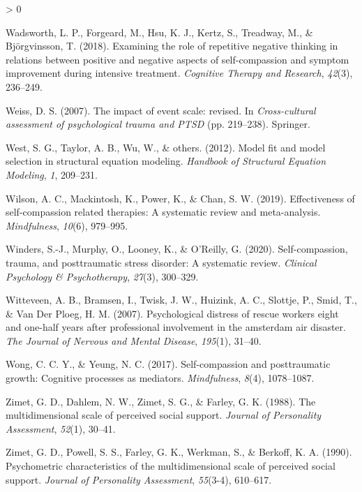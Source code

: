 \documentclass[
  english,
  man,floatsintext]{apa7}
\newlength{\cslhangindent}
\newenvironment{CSLReferences}[2] %
 {%
  \setlength{\parindent}{0pt}
  \ifodd #1 \everypar{\setlength{\hangindent}{\cslhangindent}}\ignorespaces\fi
  \ifnum #2 > 0
  \setlength{\parskip}{#2\baselineskip}
  \fi
 }%
 {}
\begin{document}
\begin{CSLReferences}{1}{0}
\leavevmode\hypertarget{ref-wadsworth2018examining}{}%
Wadsworth, L. P., Forgeard, M., Hsu, K. J., Kertz, S., Treadway, M., \& Björgvinsson, T. (2018). Examining the role of repetitive negative thinking in relations between positive and negative aspects of self-compassion and symptom improvement during intensive treatment. \emph{Cognitive Therapy and Research}, \emph{42}(3), 236--249.

\leavevmode\hypertarget{ref-weiss2007impact}{}%
Weiss, D. S. (2007). The impact of event scale: revised. In \emph{Cross-cultural assessment of psychological trauma and PTSD} (pp. 219--238). Springer.

\leavevmode\hypertarget{ref-west2012model}{}%
West, S. G., Taylor, A. B., Wu, W., \& others. (2012). Model fit and model selection in structural equation modeling. \emph{Handbook of Structural Equation Modeling}, \emph{1}, 209--231.

\leavevmode\hypertarget{ref-wilson2019effectiveness}{}%
Wilson, A. C., Mackintosh, K., Power, K., \& Chan, S. W. (2019). Effectiveness of self-compassion related therapies: A systematic review and meta-analysis. \emph{Mindfulness}, \emph{10}(6), 979--995.

\leavevmode\hypertarget{ref-winders2020self}{}%
Winders, S.-J., Murphy, O., Looney, K., \& O'Reilly, G. (2020). Self-compassion, trauma, and posttraumatic stress disorder: A systematic review. \emph{Clinical Psychology \& Psychotherapy}, \emph{27}(3), 300--329.

\leavevmode\hypertarget{ref-witteveen2007psychological}{}%
Witteveen, A. B., Bramsen, I., Twisk, J. W., Huizink, A. C., Slottje, P., Smid, T., \& Van Der Ploeg, H. M. (2007). Psychological distress of rescue workers eight and one-half years after professional involvement in the amsterdam air disaster. \emph{The Journal of Nervous and Mental Disease}, \emph{195}(1), 31--40.

\leavevmode\hypertarget{ref-wong2017self}{}%
Wong, C. C. Y., \& Yeung, N. C. (2017). Self-compassion and posttraumatic growth: Cognitive processes as mediators. \emph{Mindfulness}, \emph{8}(4), 1078--1087.

\leavevmode\hypertarget{ref-zimet1988multidimensional}{}%
Zimet, G. D., Dahlem, N. W., Zimet, S. G., \& Farley, G. K. (1988). The multidimensional scale of perceived social support. \emph{Journal of Personality Assessment}, \emph{52}(1), 30--41.

\leavevmode\hypertarget{ref-zimet1990psychometric}{}%
Zimet, G. D., Powell, S. S., Farley, G. K., Werkman, S., \& Berkoff, K. A. (1990). Psychometric characteristics of the multidimensional scale of perceived social support. \emph{Journal of Personality Assessment}, \emph{55}(3-4), 610--617.

\end{CSLReferences}
\end{document}
